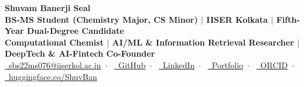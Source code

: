 \documentclass[a4paper,9pt]{article}
\begin{document}
\color{darktext}

\begin{center}
	{\large\bfseries Shuvam Banerji Seal}\\[0.15em]
	{\scriptsize\textbf{BS-MS Student (Chemistry Major, CS Minor) $\mid$ IISER Kolkata $\mid$ Fifth-Year Dual-Degree Candidate}}\\[0.1em]
	{\scriptsize\textbf{Computational Chemist $\mid$ AI/ML \& Information Retrieval Researcher $\mid$ DeepTech \& AI-Fintech Co-Founder}}\\[0.15em]
	{\tiny
	\href{mailto:sbs22ms076@iiserkol.ac.in}{\faEnvelope\ sbs22ms076@iiserkol.ac.in}~$\cdot$~%
	\href{https://github.com/Shuvam-Banerji-Seal}{\faGithub\ GitHub}~$\cdot$~%
	\href{https://www.linkedin.com/in/mastersbs}{\faLinkedin\ LinkedIn}~$\cdot$~%
	\href{https://shuvam-banerji-seal.github.io}{\faGlobe\ Portfolio}~$\cdot$~%
	\href{https://orcid.org/0009-0000-0714-569X}{\faOrcid\ ORCID}~$\cdot$~%
	\href{https://huggingface.co/ShuvBan}{\faDatabase\ huggingface.co/ShuvBan}%
	}
\end{center}

\vspace{0.05em}
\end{document}

